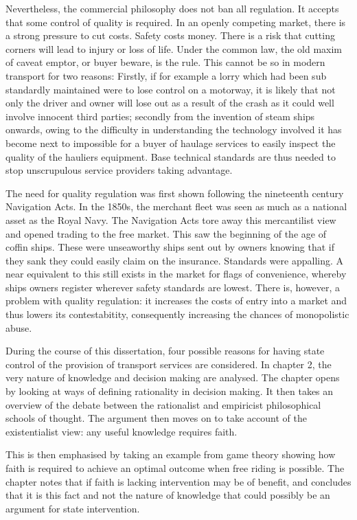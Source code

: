 Nevertheless, the commercial philosophy does not ban all regulation. It accepts that some control of quality is required. In an openly competing market, there is a strong pressure to cut costs. Safety costs money. There is a risk that cutting corners will lead to injury or loss of life. Under the common law, the old maxim of caveat emptor, or buyer beware, is the rule. This cannot be so in modern transport for two reasons: Firstly, if for example a lorry which had been sub standardly maintained were to lose control on a motorway, it is likely that not only the driver and owner will lose out as a result of the crash as it could well involve innocent third parties; secondly from the invention of steam ships onwards, owing to the difficulty in understanding the technology involved it has become next to impossible for a buyer of haulage services to easily inspect the quality of the hauliers equipment. Base technical standards are thus needed to stop unscrupulous service providers taking advantage.

The need for quality regulation was first shown following the nineteenth century Navigation Acts. In the 1850s, the merchant fleet was seen as much as a national asset as the Royal Navy. The Navigation Acts tore away this mercantilist view and opened trading to the free market. This saw the beginning of the age of coffin ships. These were unseaworthy ships sent out by owners knowing that if they sank they could easily claim on the insurance. Standards were appalling. A near equivalent to this still exists in the market for flags of convenience, whereby ships owners register wherever safety standards are lowest. There is, however, a problem with quality regulation: it increases the costs of entry into a market and thus lowers its contestabitity, consequently increasing the chances of monopolistic abuse.

During the course of this dissertation, four possible reasons for having state control of the provision of transport services are considered. In chapter 2, the very nature of knowledge and decision making are analysed. The chapter opens by looking at ways of defining rationality in decision making. It then takes an overview of the debate between the rationalist and empiricist philosophical schools of thought. The argument then moves on to take account of the existentialist view: any useful knowledge requires faith. 

This is then emphasised by taking an example from game theory showing how faith is required to achieve an optimal outcome when free riding is possible. The chapter notes that if faith is lacking intervention may be of benefit, and concludes that it is this fact and not the nature of knowledge that could possibly be an argument for state intervention.

